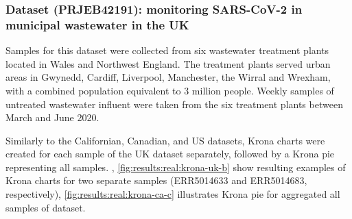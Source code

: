     \subsubsection{Dataset (PRJEB42191): monitoring SARS-CoV-2 in municipal wastewater in the UK} \label{sec:results:real:uk}
    Samples for this dataset were collected from six wastewater treatment plants located in Wales and Northwest England. The treatment plants served urban areas in Gwynedd, Cardiff, Liverpool, Manchester, the Wirral and Wrexham, with a combined population equivalent to 3 million people. Weekly samples of untreated wastewater influent were taken from the six treatment plants between March and June 2020.
    
    Similarly to the Californian, Canadian, and US datasets, Krona charts were created for each sample of the UK dataset separately, followed by a Krona pie representing all samples. , \ref{fig:results:real:krona-uk-b} show resulting examples of Krona charts for two separate samples (ERR5014633 and ERR5014683, respectively), \cref{fig:results:real:krona-ca-c} illustrates Krona pie for aggregated all samples of dataset.
    
